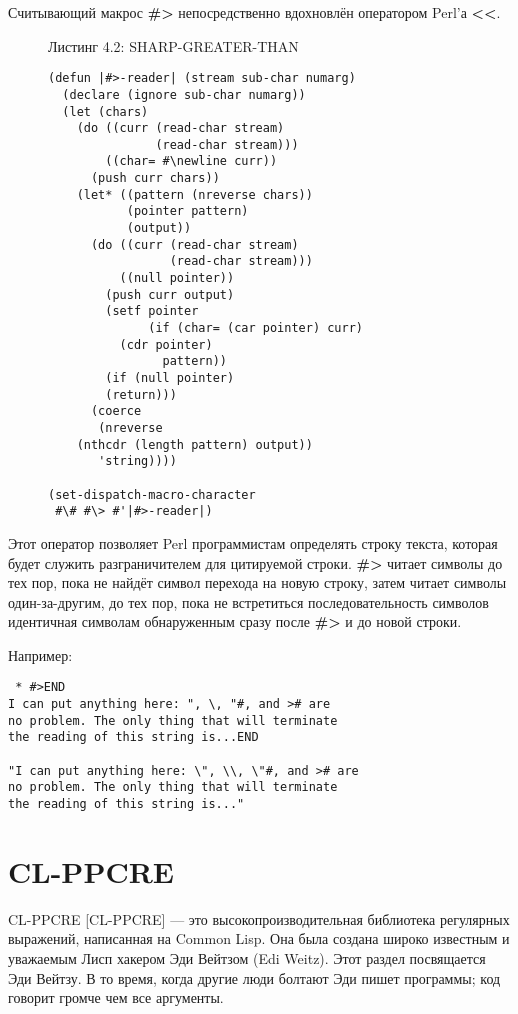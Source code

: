 Считывающий макрос \textbf{\#>} непосредственно вдохновлён оператором Perl'а \textbf{<<}. 

\begin{figure}Листинг 4.2: SHARP-GREATER-THAN\label{listing_4.2}
\listbegin
\begin{verbatim}
(defun |#>-reader| (stream sub-char numarg)
  (declare (ignore sub-char numarg))
  (let (chars)
    (do ((curr (read-char stream)
               (read-char stream)))
        ((char= #\newline curr))
      (push curr chars))
    (let* ((pattern (nreverse chars))
           (pointer pattern)
           (output))
      (do ((curr (read-char stream)
                 (read-char stream)))
          ((null pointer))
        (push curr output)
        (setf pointer
              (if (char= (car pointer) curr)
		  (cdr pointer)
                pattern))
        (if (null pointer)
	    (return)))
      (coerce
       (nreverse
	(nthcdr (length pattern) output))
       'string))))

(set-dispatch-macro-character
 #\# #\> #'|#>-reader|)
\end{verbatim}
\listend
\end{figure}

Этот оператор позволяет Perl программистам определять строку текста, которая будет служить разграничителем для цитируемой строки. \textbf{\#>} читает символы до тех пор, пока не найдёт символ перехода на новую строку, затем читает символы один-за-другим, до тех пор, пока не встретиться последовательность символов идентичная символам обнаруженным сразу после \textbf{\#>} и до новой строки.

Например:

\begin{verbatim}
 * #>END
I can put anything here: ", \, "#, and ># are
no problem. The only thing that will terminate
the reading of this string is...END

"I can put anything here: \", \\, \"#, and ># are
no problem. The only thing that will terminate
the reading of this string is..."
\end{verbatim}

\section{CL-PPCRE}\label{section_cl-ppcre}

CL-PPCRE [CL-PPCRE] --- это высокопроизводительная библиотека регулярных выражений, написанная на Common Lisp. Она была создана широко известным и уважаемым Лисп хакером Эди Вейтзом (Edi Weitz). Этот раздел посвящается Эди Вейтзу. В то время, когда другие люди болтают Эди пишет программы; код говорит громче чем все аргументы.

